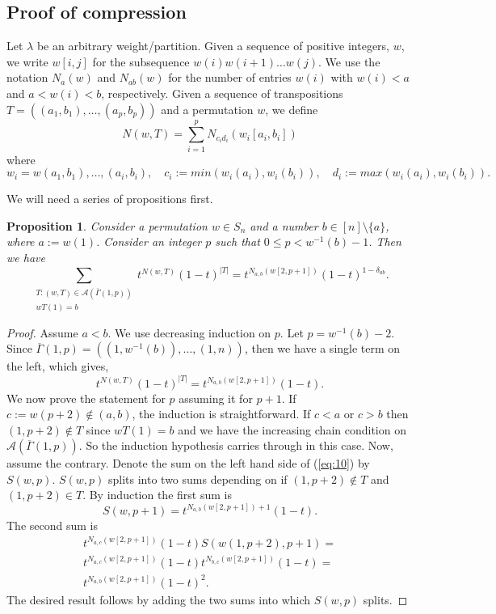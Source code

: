 \documentclass[11pt]{amsart}
\newtheorem{prop}{Proposition}[section]
\begin{document}
{\subsection{Proof of compression}
Let $\lambda$ be an arbitrary weight/partition. Given a sequence of positive integers, $w$, we write $w[i,j]$ for the subsequence $w(i)w(i+1) \ldots w(j)$. We use the notation $N_{a}(w)$ and $N_{ab}(w)$ for the number of entries $w(i)$ with $w(i)<a$ and $a<w(i)<b$, respectively. Given a sequence of transpositions 
$T=((a_{1},b_{1}), \ldots ,(a_{p},b_{p}))$ and a permutation $w$, we define 
$$
N(w,T)=\sum_{i=1}^{p} N_{c_{i}d_{i}}(w_{i}[a_{i},b_{i}])
$$
where
$$
w_{i}=w(a_{1},b_{1}), \ldots , (a_{i},b_{i}), \quad c_{i}:=min(w_{i}(a_{i}),w_{i}(b_{i})),   \quad d_{i}:=max(w_{i}(a_{i}),w_{i}(b_{i})).$$





We will need a series of propositions first.
\begin{prop}\label{prop1}
Consider a permutation $w \in S_{n}$ and a number $b \in [n]\setminus \{a\}$, where $a:=w(1)$. Consider an integer $p$ such that $0\leq p < w^{-1}(b)-1$. Then we have 
\begin{equation} \label{eq:10}
\sum_{\substack{T:(w,T)\in \mathcal{A}(\overline{\Gamma}(1,p)) \\ wT(1)=b}} t^{N(w,T)}(1-t)^{|T|}=t^{N_{a,b}(w[2,p+1])}(1-t)^{1- \delta_{ab}}.
\end{equation} 
\end{prop}
\begin{proof}
Assume $a<b$. We use decreasing induction on $p$. Let $p=w^{-1}(b)-2$. Since $\overline{\Gamma}(1,p)=((1,w^{-1}(b)), \ldots , (1,n))$, then we have a single term on the left, which gives, $$t^{N(w,T)}(1-t)^{|T|}=t^{N_{a,b}(w[2,p+1])}(1-t).$$ We now prove the statement for $p$ assuming it for $p+1$. If $c:=w(p+2)\not \in (a,b)$, the induction is straightforward. If $c<a$ or $c>b$ then $(1,p+2)\not \in T$ since $wT(1)=b$ and we have the increasing chain condition on $\mathcal{A}(\overline{\Gamma}(1,p))$. So the induction hypothesis carries through in this case. Now, assume the contrary. Denote the sum on the left hand side of (\ref{eq:10}) by $S(w,p)$. $S(w,p)$ splits into two sums depending on if $(1,p+2)\not \in T$ and $(1,p+2)\in T$. By induction the first sum is $$S(w,p+1)=t^{N_{a,b}(w[2,p+1])+1}(1-t).$$ The second sum is \begin{align*}t^{N_{a,c}(w[2,p+1])}(1-t)S(w(1,p+2),p+1)=\\t^{N_{a,c}(w[2,p+1])}(1-t)t^{N_{b,c}(w[2,p+1])}(1-t)=\\t^{N_{a,b}(w[2,p+1])}(1-t)^{2}.\end{align*} The desired result follows by adding the two sums into which $S(w,p)$ splits.
\end{proof}

}
\end{document}
